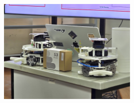 \begin{figure}[!htb]
    \begin{minipage}{0.41\textwidth}
        \includegraphics[height=5cm]{assets/images/hardware/irl-2-robots.jpeg}
        \caption{}
        \label{fig:irl-2-robot}
    \end{minipage}
\end{figure}




